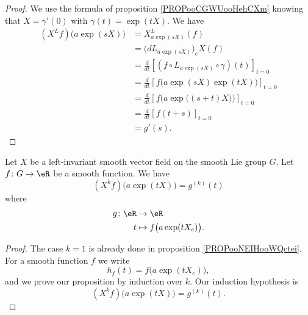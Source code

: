 \begin{theorem}
\begin{proof}
	We use the formula of proposition \ref{PROPooCGWUooHehCXm} knowing that \( X=\gamma'(0)\) with \( \gamma(t)=\exp(tX)\). We have
	\begin{subequations}
		\begin{align}
			(X^Lf)\big( a\exp(sX) \big) & =X^L_{a\exp(sX)}(f)                                                       \\
			                            & =\big( dL_{a\exp(sX)} \big)_eX(f)                                         \\
			                            & =\frac{d}{dt} \left[ (f\circ L_{a\exp(sX)}\circ \gamma)(t)  \right]_{t=0} \\
			                            & =\frac{d}{dt} \left[ f\big( a\exp(sX)\exp(tX) \big)  \right]_{t=0}        \\
			                            & =\frac{d}{dt} \left[ f\Big( a\exp\big( (s+t)X \big) \Big)  \right]_{t=0}  \\
			                            & =\frac{d}{dt} \left[ f(t+s)  \right]_{t=0}                                \\
			                            & =g'(s).
		\end{align}
	\end{subequations}
\end{proof}

\begin{proposition}	\label{PROPooPEKNooUAeMjp}
	Let \( X\) be a left-invariant smooth vector field on the smooth Lie group \( G\). Let \(f \colon G\to \eR  \) be a smooth function. We have
	\begin{equation}
		(X^kf)\big( a\exp(tX) \big)=g^{(k)}(t)
	\end{equation}
	where
	\begin{equation}
		\begin{aligned}
			g\colon \eR & \to \eR                              \\
			t           & \mapsto    f\big( a\exp(tX_e) \big).
		\end{aligned}
	\end{equation}
\end{proposition}

\begin{proof}
	The case \( k=1\) is already done in proposition \ref{PROPooNEIHooWQctei}. For a smooth function \( f\) we write
	\begin{equation}
		h_f(t)=f\big( a\exp(tX_e) \big),
	\end{equation}
	and we prove our proposition by induction over \( k\). Our induction hypothesis is
	\begin{equation}
		(X^kf)\big( a\exp(tX) \big)=g^{(k)}(t).
	\end{equation}


\end{proof}
\end{theorem}
